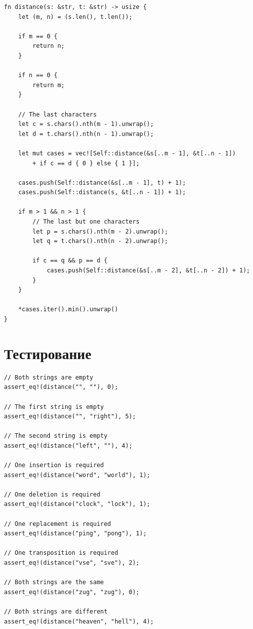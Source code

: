 \documentclass{report}
\begin{document}
\begin{lstlisting}[caption=
    Простая рекурсивная реализация алгоритма поиска расстояния
    Дамерау-Левенштейна.
]
fn distance(s: &str, t: &str) -> usize {
    let (m, n) = (s.len(), t.len());

    if m == 0 {
        return n;
    }

    if n == 0 {
        return m;
    }

    // The last characters
    let c = s.chars().nth(m - 1).unwrap();
    let d = t.chars().nth(n - 1).unwrap();

    let mut cases = vec![Self::distance(&s[..m - 1], &t[..n - 1])
        + if c == d { 0 } else { 1 }];

    cases.push(Self::distance(&s[..m - 1], t) + 1);
    cases.push(Self::distance(s, &t[..n - 1]) + 1);

    if m > 1 && n > 1 {
        // The last but one characters
        let p = s.chars().nth(m - 2).unwrap();
        let q = t.chars().nth(n - 2).unwrap();

        if c == q && p == d {
            cases.push(Self::distance(&s[..m - 2], &t[..n - 2]) + 1);
        }
    }

    *cases.iter().min().unwrap()
}
\end{lstlisting}

\section{Тестирование}

\begin{lstlisting}[caption=Тесты алгоритмов поиска расстояния Левенштейна]
// Both strings are empty
assert_eq!(distance("", ""), 0);

// The first string is empty
assert_eq!(distance("", "right"), 5);

// The second string is empty
assert_eq!(distance("left", ""), 4);

// One insertion is required
assert_eq!(distance("word", "world"), 1);

// One deletion is required
assert_eq!(distance("clock", "lock"), 1);

// One replacement is required
assert_eq!(distance("ping", "pong"), 1);

// One transposition is required
assert_eq!(distance("vse", "sve"), 2);

// Both strings are the same
assert_eq!(distance("zug", "zug"), 0);

// Both strings are different
assert_eq!(distance("heaven", "hell"), 4);
\end{lstlisting}
\end{document}
